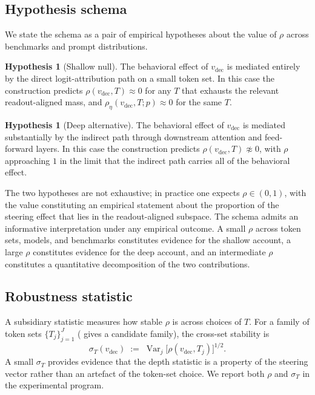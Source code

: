 \documentclass[11pt,letterpaper]{article}
\theoremstyle{plain}
\theoremstyle{definition}
\newtheorem{hypothesis}[theorem]{Hypothesis}
\DeclareMathOperator{\Var}{Var}
\newcommand{\1}{\mathbf{1}}
\newcommand{\vdec}{v_{\text{dec}}}
\begin{document}
\subsection{Hypothesis schema}

We state the schema as a pair of empirical hypotheses about the value of $\rho$ across benchmarks and prompt distributions.

\begin{hypothesis}[Shallow null]\label{hyp:shallow}
The behavioral effect of $\vdec$ is mediated entirely by the direct logit-attribution path on a small token set. In this case the construction predicts $\rho(\vdec, T) \approx 0$ for any $T$ that exhausts the relevant readout-aligned mass, and $\rho_\eta(\vdec, T; p) \approx 0$ for the same $T$.
\end{hypothesis}

\begin{hypothesis}[Deep alternative]\label{hyp:deep}
The behavioral effect of $\vdec$ is mediated substantially by the indirect path through downstream attention and feed-forward layers. In this case the construction predicts $\rho(\vdec, T) \not\approx 0$, with $\rho$ approaching $1$ in the limit that the indirect path carries all of the behavioral effect.
\end{hypothesis}

The two hypotheses are not exhaustive; in practice one expects $\rho \in (0, 1)$, with the value constituting an empirical statement about the proportion of the steering effect that lies in the readout-aligned subspace. The schema admits an informative interpretation under any empirical outcome. A small $\rho$ across token sets, models, and benchmarks constitutes evidence for the shallow account, a large $\rho$ constitutes evidence for the deep account, and an intermediate $\rho$ constitutes a quantitative decomposition of the two contributions.

\subsection{Robustness statistic}

A subsidiary statistic measures how stable $\rho$ is across choices of $T$. For a family of token sets $\{T_j\}_{j=1}^J$ ( gives a candidate family), the cross-set stability is
\begin{equation}
\sigma_T(\vdec) \;:=\; \Var_{j} \big[ \rho(\vdec, T_j) \big]^{1/2}.
\label{eq:sigmaT}
\end{equation}
A small $\sigma_T$ provides evidence that the depth statistic is a property of the steering vector rather than an artefact of the token-set choice. We report both $\rho$ and $\sigma_T$ in the experimental program.
\end{document}

